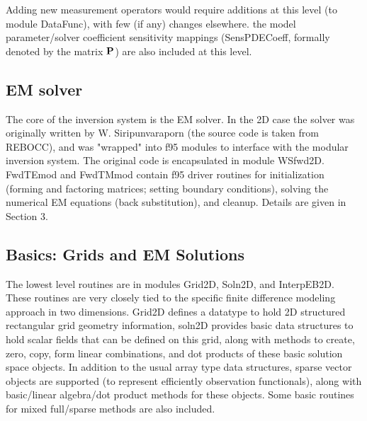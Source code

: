 \documentclass[12pt]{article}
\begin{document}
Adding new measurement operators
would require additions at this level (to module DataFunc), 
with few (if any) changes elsewhere.  
the model parameter/solver coefficient sensitivity mappings
(SensPDECoeff, formally denoted by the matrix $\bf P$) are also included at
this level.

\subsection{EM solver}
The core of the inversion system is the EM solver.  In
the 2D case the solver was originally written by W. Siripunvaraporn
(the source code is taken from REBOCC), and was "wrapped"
into f95 modules to interface with the modular inversion system.
The original code is encapsulated in module WSfwd2D.  FwdTEmod
and FwdTMmod contain f95 driver routines for initialization
(forming and factoring matrices; setting boundary conditions),
solving the numerical EM equations (back substitution), and cleanup.
Details are given in Section 3.

\subsection{Basics: Grids and EM Solutions}
The lowest level routines are in modules Grid2D, Soln2D, and 
InterpEB2D.  These routines are very closely tied to the specific
finite difference modeling approach in two dimensions.  Grid2D defines a datatype
to hold 2D structured rectangular grid geometry information,
soln2D provides basic data structures to hold scalar fields
that can be defined on this grid, along with methods to create, zero, copy,
form linear combinations, and dot products of these basic solution
space objects.  In addition to the usual array type data structures,
sparse vector objects are supported (to represent efficiently
observation functionals), along with basic/linear algebra/dot
product methods for these objects.  Some basic routines for
mixed full/sparse methods are also included.  
\end{document}
